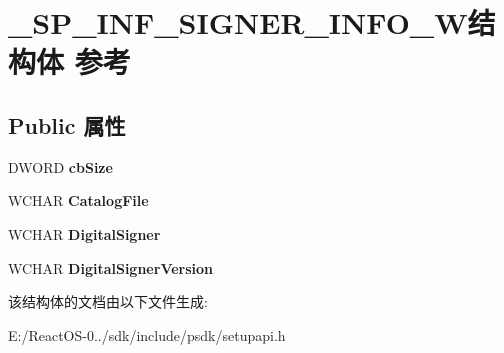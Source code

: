 \hypertarget{struct___s_p___i_n_f___s_i_g_n_e_r___i_n_f_o___w}{}\section{\+\_\+\+S\+P\+\_\+\+I\+N\+F\+\_\+\+S\+I\+G\+N\+E\+R\+\_\+\+I\+N\+F\+O\+\_\+\+W结构体 参考}
\label{struct___s_p___i_n_f___s_i_g_n_e_r___i_n_f_o___w}
\subsection*{Public 属性}
\begin{DoxyCompactItemize}
\item 
\mbox{\label{struct___s_p___i_n_f___s_i_g_n_e_r___i_n_f_o___w_aac9ad2563d1eb8b7ca56e1cad846ce6e}} 
D\+W\+O\+RD {\bfseries cb\+Size}
\item 
\mbox{\label{struct___s_p___i_n_f___s_i_g_n_e_r___i_n_f_o___w_a7f48d799f5041701648e17335aebac95}} 
W\+C\+H\+AR {\bfseries Catalog\+File}
\item 
\mbox{\label{struct___s_p___i_n_f___s_i_g_n_e_r___i_n_f_o___w_a3e26212f10b0379ef4f354db2ac58d33}} 
W\+C\+H\+AR {\bfseries Digital\+Signer}
\item 
\mbox{\label{struct___s_p___i_n_f___s_i_g_n_e_r___i_n_f_o___w_adf86bfb517c6cf886cb4e72ed1487395}} 
W\+C\+H\+AR {\bfseries Digital\+Signer\+Version}
\end{DoxyCompactItemize}


该结构体的文档由以下文件生成\+:\begin{DoxyCompactItemize}
\item 
E\+:/\+React\+O\+S-\/0../sdk/include/psdk/setupapi.\+h\end{DoxyCompactItemize}
